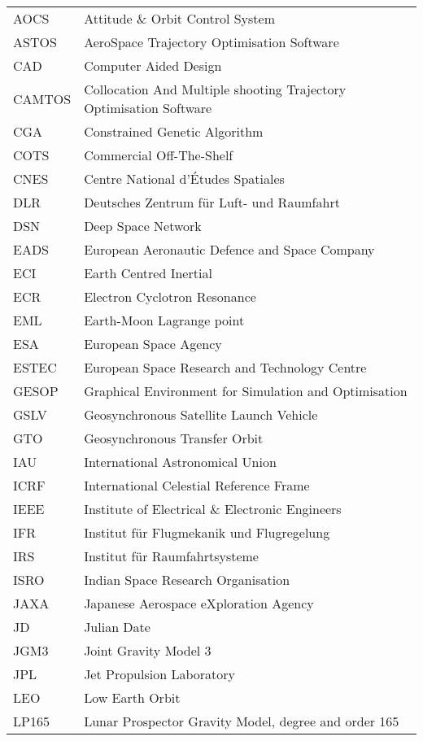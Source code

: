 \begin{longtable}{l p{}}

AOCS & Attitude \& Orbit Control System \\
ASTOS & AeroSpace Trajectory Optimisation Software \\
CAD & Computer Aided Design \\
CAMTOS & Collocation And Multiple shooting Trajectory Optimisation Software \\
CGA & Constrained Genetic Algorithm \\
COTS & Commercial Off-The-Shelf \\
CNES & Centre National d'\'{E}tudes Spatiales \\
DLR & Deutsches Zentrum f\"{u}r Luft- und Raumfahrt \\
DSN & Deep Space Network \\
EADS & European Aeronautic Defence and Space Company \\
ECI & Earth Centred Inertial \\
ECR & Electron Cyclotron Resonance \\
EML & Earth-Moon Lagrange point \\
ESA & European Space Agency \\
ESTEC &  European Space Research and Technology Centre \\
GESOP & Graphical Environment for Simulation and Optimisation \\
GSLV & Geosynchronous Satellite Launch Vehicle \\
GTO & Geosynchronous Transfer Orbit \\
IAU & International Astronomical Union \\
ICRF & International Celestial Reference Frame \\
IEEE & Institute of Electrical \& Electronic Engineers \\
IFR & Institut f\"{u}r Flugmekanik und Flugregelung \\
IRS & Institut f\"{u}r Raumfahrtsysteme \\
ISRO & Indian Space Research Organisation \\
JAXA & Japanese Aerospace eXploration Agency \\
JD & Julian Date \\
JGM3 & Joint Gravity Model 3 \\
JPL & Jet Propulsion Laboratory \\
LEO & Low Earth Orbit \\
LP165 & Lunar Prospector Gravity Model, degree and order 165 \\

\end{longtable}
